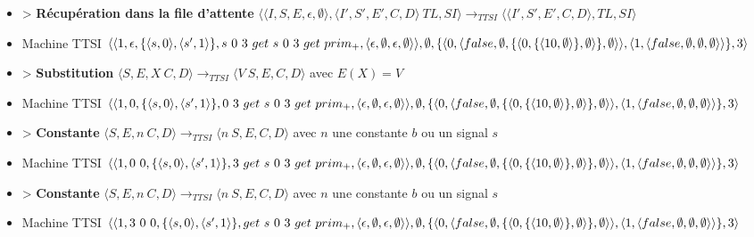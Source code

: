 \documentclass[10pt,a4paper]{report}
\begin{document}
\begin{itemize}
 				\item[] > \textbf{Récupération dans la file d'attente} $\langle\langle I,S,E,\epsilon,\emptyset\rangle,\langle I',S',E',C,D\rangle~TL,SI\rangle 
 				\longrightarrow_{TTSI} 
 				\langle\langle I',S',E',C,D\rangle,TL,SI\rangle$
 				\item[] Machine TTSI $\langle\langle 1,\epsilon,\{\langle s,0\rangle,\langle s',1\rangle\},s~0~3~get~s~0~3~get~prim_{+} ,\langle\epsilon,\emptyset,\epsilon,\emptyset\rangle\rangle,\emptyset,\{\langle 0,\langle false,\emptyset,\{\langle 0,\{\langle 10,\emptyset\rangle\},\emptyset\rangle\},\emptyset\rangle\rangle,\\\langle 1,\langle false,\emptyset,\emptyset,\emptyset\rangle\rangle\},3\rangle$ 
 				\item[] > \textbf{Substitution} $\langle S,E,X~C,D\rangle
 				\longrightarrow_{TTSI} 
 				\langle V~S,E,C,D\rangle$ avec $E(X) = V$
 				\item[] Machine TTSI $\langle\langle 1,0,\{\langle s,0\rangle,\langle s',1\rangle\},0~3~get~s~0~3~get~prim_{+} ,\langle\epsilon,\emptyset,\epsilon,\emptyset\rangle\rangle,\emptyset,\{\langle 0,\langle false,\emptyset,\{\langle 0,\{\langle 10,\emptyset\rangle\},\emptyset\rangle\},\emptyset\rangle\rangle,\\\langle 1,\langle false,\emptyset,\emptyset,\emptyset\rangle\rangle\},3\rangle$ 
 				\item[] > \textbf{Constante} $\langle S,E,n~C,D\rangle 
 				\longrightarrow_{TTSI} 
 				\langle n~S,E,C,D\rangle$ avec $n$ une constante $b$ ou un signal $s$
 				\item[] Machine TTSI $\langle\langle 1,0~0,\{\langle s,0\rangle,\langle s',1\rangle\},3~get~s~0~3~get~prim_{+} ,\langle\epsilon,\emptyset,\epsilon,\emptyset\rangle\rangle,\emptyset,\{\langle 0,\langle false,\emptyset,\{\langle 0,\{\langle 10,\emptyset\rangle\},\emptyset\rangle\},\emptyset\rangle\rangle,\\\langle 1,\langle false,\emptyset,\emptyset,\emptyset\rangle\rangle\},3\rangle$ 
 				\item[] > \textbf{Constante} $\langle S,E,n~C,D\rangle 
 				\longrightarrow_{TTSI} 
 				\langle n~S,E,C,D\rangle$ avec $n$ une constante $b$ ou un signal $s$
 				\item[] Machine TTSI $\langle\langle 1,3~0~0,\{\langle s,0\rangle,\langle s',1\rangle\},get~s~0~3~get~prim_{+} ,\langle\epsilon,\emptyset,\epsilon,\emptyset\rangle\rangle,\emptyset,\{\langle 0,\langle false,\emptyset,\{\langle 0,\{\langle 10,\emptyset\rangle\},\emptyset\rangle\},\emptyset\rangle\rangle,\\\langle 1,\langle false,\emptyset,\emptyset,\emptyset\rangle\rangle\},3\rangle$ 

\end{itemize}
\end{document}
